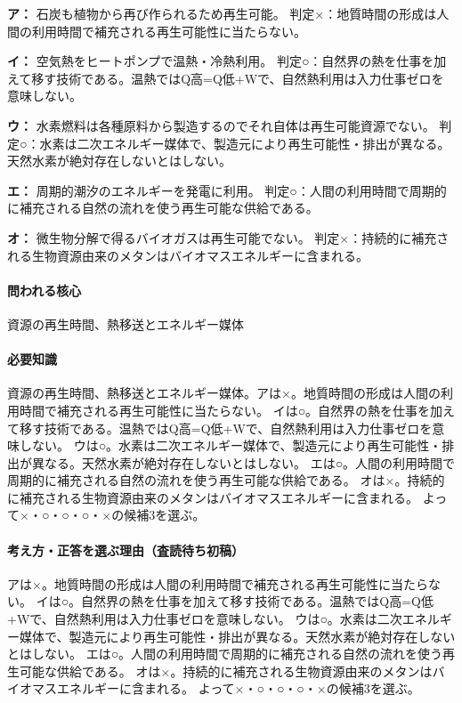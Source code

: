 \noindent\textbf{ア：} 石炭も植物から再び作られるため再生可能。 判定×：地質時間の形成は人間の利用時間で補充される再生可能性に当たらない。\par

\noindent\textbf{イ：} 空気熱をヒートポンプで温熱・冷熱利用。 判定○：自然界の熱を仕事を加えて移す技術である。温熱ではQ高=Q低+Wで、自然熱利用は入力仕事ゼロを意味しない。\par

\noindent\textbf{ウ：} 水素燃料は各種原料から製造するのでそれ自体は再生可能資源でない。 判定○：水素は二次エネルギー媒体で、製造元により再生可能性・排出が異なる。天然水素が絶対存在しないとはしない。\par

\noindent\textbf{エ：} 周期的潮汐のエネルギーを発電に利用。 判定○：人間の利用時間で周期的に補充される自然の流れを使う再生可能な供給である。\par

\noindent\textbf{オ：} 微生物分解で得るバイオガスは再生可能でない。 判定×：持続的に補充される生物資源由来のメタンはバイオマスエネルギーに含まれる。\par

\paragraph{問われる核心} 資源の再生時間、熱移送とエネルギー媒体

\paragraph{必要知識} 資源の再生時間、熱移送とエネルギー媒体。アは×。地質時間の形成は人間の利用時間で補充される再生可能性に当たらない。 イは○。自然界の熱を仕事を加えて移す技術である。温熱ではQ高=Q低+Wで、自然熱利用は入力仕事ゼロを意味しない。 ウは○。水素は二次エネルギー媒体で、製造元により再生可能性・排出が異なる。天然水素が絶対存在しないとはしない。 エは○。人間の利用時間で周期的に補充される自然の流れを使う再生可能な供給である。 オは×。持続的に補充される生物資源由来のメタンはバイオマスエネルギーに含まれる。 よって×・○・○・○・×の候補3を選ぶ。

\paragraph{考え方・正答を選ぶ理由（査読待ち初稿）} アは×。地質時間の形成は人間の利用時間で補充される再生可能性に当たらない。 イは○。自然界の熱を仕事を加えて移す技術である。温熱ではQ高=Q低+Wで、自然熱利用は入力仕事ゼロを意味しない。 ウは○。水素は二次エネルギー媒体で、製造元により再生可能性・排出が異なる。天然水素が絶対存在しないとはしない。 エは○。人間の利用時間で周期的に補充される自然の流れを使う再生可能な供給である。 オは×。持続的に補充される生物資源由来のメタンはバイオマスエネルギーに含まれる。 よって×・○・○・○・×の候補3を選ぶ。

